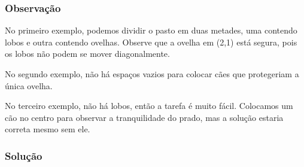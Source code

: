 \subsubsection*{Observação}
No primeiro exemplo, podemos dividir o pasto em duas metades, uma contendo lobos e outra contendo ovelhas. Observe que a ovelha em (2,1) está segura, pois os lobos não podem se mover diagonalmente.

No segundo exemplo, não há espaços vazios para colocar cães que protegeriam a única ovelha.

No terceiro exemplo, não há lobos, então a tarefa é muito fácil. Colocamos um cão no centro para observar a tranquilidade do prado, mas a solução estaria correta mesmo sem ele.

\subsubsection*{Solução}

